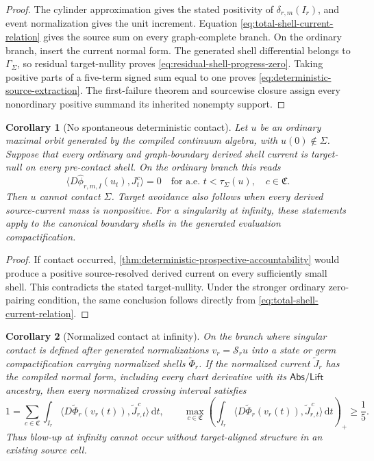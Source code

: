 \documentclass[11pt]{article}
\numberwithin{section}{part}
\theoremstyle{plain}
\newtheorem{corollary}[corollary]{Corollary}
\theoremstyle{definition}
\theoremstyle{remark}
\newcommand{\dd}{\,\mathrm d}
\newcommand{\Abs}{\mathsf{Abs}}
\newcommand{\Lift}{\mathsf{Lift}}
\newcommand{\Channels}{\mathfrak C}
\begin{document}
\begin{proof}
The cylinder approximation gives the stated positivity of
\(\delta_{r,m}(I_r)\), and event normalization gives the unit increment.
Equation \eqref{eq:total-shell-current-relation} gives the source sum on every
graph-complete branch.  On the ordinary branch, insert the current normal
form.  The generated shell differential belongs to \(\Gamma_\Sigma\), so
residual target-nullity proves \eqref{eq:residual-shell-progress-zero}.
Taking positive parts of a five-term signed sum equal to one proves
\eqref{eq:deterministic-source-extraction}.  The first-failure theorem and
sourcewise closure assign every nonordinary positive summand its inherited
nonempty support.
\end{proof}

\begin{corollary}[No spontaneous deterministic contact]
\label{cor:prospective-source-before-contact}
Let \(u\) be an ordinary maximal orbit generated by the compiled continuum
algebra, with \(u(0)\notin\Sigma\).  Suppose that every ordinary and
graph-boundary derived shell current is target-null on every pre-contact
shell.  On the ordinary branch this reads
\begin{equation}
 \label{eq:all-source-shell-null}
 \langle D\widehat\phi_{r,m,I}(u_t),J_t^c\rangle=0
 \quad\text{for a.e. }t<\tau_\Sigma(u),
 \quad c\in\Channels.
\end{equation}
Then \(u\) cannot contact \(\Sigma\).  Target avoidance also follows when every
derived source-current mass is nonpositive.  For a
singularity at infinity, these statements apply to the canonical boundary
shells in the generated evaluation compactification.
\end{corollary}

\begin{proof}
If contact occurred, \cref{thm:deterministic-prospective-accountability} would
produce a positive source-resolved derived current on every sufficiently small
shell.  This contradicts the stated target-nullity.  Under the stronger
ordinary zero-pairing condition, the same conclusion follows directly from
\eqref{eq:total-shell-current-relation}.
\end{proof}

\begin{corollary}[Normalized contact at infinity]
\label{cor:normalized-contact-at-infinity}
On the branch where singular contact is defined after generated normalizations
\(v_r=\mathcal S_r u\) into a state or germ compactification carrying
normalized shells \(\widetilde\Phi_r\).  If the normalized current
\(\widetilde J_r\) has the compiled normal form, including every chart derivative with
its \(\Abs/\Lift\) ancestry, then every normalized crossing interval satisfies
\[
 1
 =\sum_{c\in\Channels}
   \int_{I_r}
   \langle D\widetilde\Phi_r(v_r(t)),
           \widetilde J_{r,t}^{\,c}\rangle\dd t,
 \qquad
 \max_{c\in\Channels}
 \left(
   \int_{I_r}
   \langle D\widetilde\Phi_r(v_r(t)),
           \widetilde J_{r,t}^{\,c}\rangle\dd t
 \right)_+
 \ge\frac15.
\]
Thus blow-up at infinity cannot occur without target-aligned structure in an
existing source cell.
\end{corollary}
\end{document}
